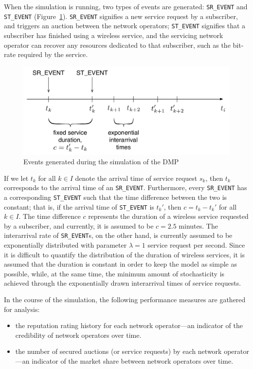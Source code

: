 When the simulation is running, two types of events are generated: \lstinline{SR_EVENT} and \lstinline{ST_EVENT} (Figure~\ref{fig:dm_events_dmappendix}). \lstinline{SR_EVENT} signifies a new service request by a subscriber, and triggers an auction between the network operators; \lstinline{ST_EVENT} signifies that a subscriber has finished using a wireless service, and the servicing network operator can recover any resources dedicated to that subscriber, such as the bit-rate required by the service.
\begin{figure}[t]
	\includegraphics[width=\figsize]{Appendices/Figures/dm_events}
	\caption{Events generated during the simulation of the DMP}
	\label{fig:dm_events_dmappendix}
\end{figure}
If we let $t_k$ for all $k\in I$ denote the arrival time of service request $s_k$, then $t_k$ corresponds to the arrival time of an \lstinline{SR_EVENT}. Furthermore, every \lstinline{SR_EVENT} has a corresponding \lstinline{ST_EVENT} such that the time difference between the two is constant; that is, if the arrival time of \lstinline{ST_EVENT} is $t_k'$, then $c = t_k - t_k'$ for all $k\in I$. The time difference $c$ represents the duration of a wireless service requested by a subscriber, and currently, it is assumed to be $c=2.5$ minutes. The interarrival rate of \lstinline{SR_EVENT}s, on the other hand, is currently assumed to be exponentially distributed with parameter $\lambda=1$ service request per second. Since it is difficult to quantify the distribution of the duration of wireless services, it is assumed that the duration is constant in order to keep the model as simple as possible, while, at the same time, the minimum amount of stochasticity is achieved through the exponentially drawn interarrival times of service requests.

In the course of the simulation, the following performance measures are gathered for analysis:
\begin{itemize}
	\item the reputation rating history for each network operator---an indicator of the credibility of network operators over time.
	\item the number of secured auctions (or service requests) by each network operator---an indicator of the market share between network operators over time.
\end{itemize}

